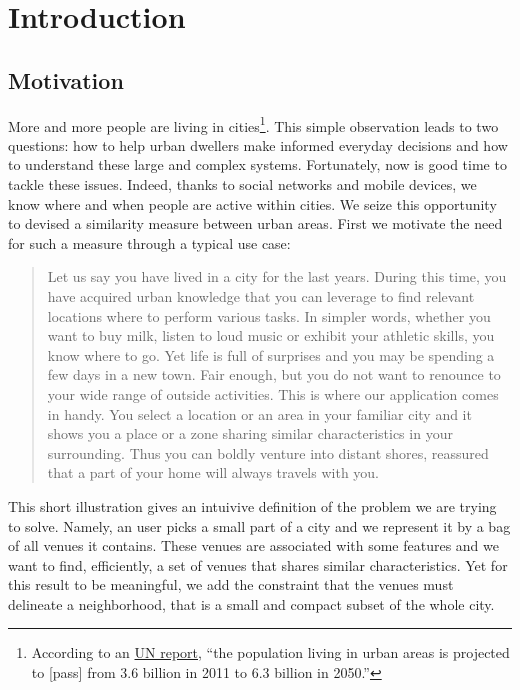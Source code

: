 \chapter{Introduction}
\label{ch:introduction}

\section{Motivation}

More and more people are living in cities\footnote{According to an
\href{http://esa.un.org/unup/pdf/WUP2011_Highlights.pdf}{UN report},
\enquote{the population living in urban areas is projected to [pass] from 3.6
billion in 2011 to 6.3 billion in 2050.}}. This simple observation leads to
two questions: how to help urban dwellers make informed everyday decisions and
how to understand these large and complex systems. Fortunately, now is good
time to tackle these issues. Indeed, thanks to social networks and mobile
devices, we know where and when people are active within
cities\autocite{SpatialComputing12}. We seize this opportunity to devised a
similarity measure between urban areas. First we motivate the need for such a
measure through a typical use case:

\begin{quote}
Let us say you have lived in a city for the last years. During this time,
you have acquired urban knowledge that you can leverage to find relevant
locations where to perform various tasks. In simpler words, whether you want
to buy milk, listen to loud music or exhibit your athletic skills, you know
where to go. Yet life is full of surprises and you may be spending a few
days in a new town. Fair enough, but you do not want to renounce to your
wide range of outside activities. This is where our application comes in
handy. You select a location or an area in your familiar city and it shows
you a place or a zone sharing similar characteristics in your surrounding.
Thus you can boldly venture into distant shores, reassured that a part of
your home will always travels with you.
\end{quote}

This short illustration gives an intuivive definition of the problem we are
trying to solve. Namely, an user picks a small part of a city and we represent
it by a bag of all venues it contains. These venues are associated with some
features and we want to find, efficiently, a set of venues that shares similar
characteristics. Yet for this result to be meaningful, we add the constraint
that the venues must delineate a neighborhood, that is a small and compact
subset of the whole city.

